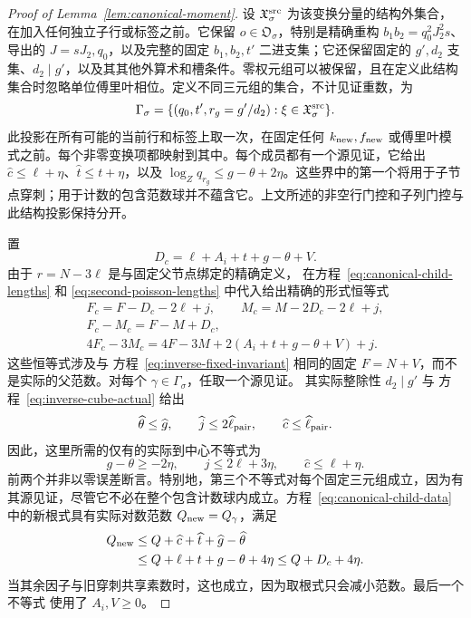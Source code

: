 \documentclass[11pt,a4paper]{article}
\numberwithin{equation}{section}
\numberwithin{figure}{section}
\theoremstyle{definition}
\theoremstyle{remark}
\begin{document}
\begin{proof}[Proof of Lemma~\ref{lem:canonical-moment}]
设 \(\mathfrak X_\sigma^{\rm src}\) 为该变换分量的结构外集合，在加入任何独立子行或标签之前。它保留
\(o\in\mathfrak O_\sigma\)，特别是精确重构
\(b_1b_2=q_0^2J_2^2s\)、导出的 \(J=sJ_2,q_0\)，以及完整的固定
\(b_1,b_2,t'\) 二进支集；它还保留固定的
\(g',d_2\) 支集、\(d_2\mid g'\)，以及其其他外算术和槽条件。零权元组可以被保留，且在定义此结构集合时忽略单位傅里叶相位。定义不同三元组的集合，不计见证重数，为
\begin{equation}\label{eq:inverse-source-triples}
 \Gamma_\sigma=
 \{(q_0,t',r_g=g'/d_2):\xi\in\mathfrak X_\sigma^{\rm src}\}.
\end{equation}
此投影在所有可能的当前行和标签上取一次，在固定任何 \(k_{\rm new},f_{\rm new}\) 或傅里叶模式之前。每个非零变换项都映射到其中。每个成员都有一个源见证，它给出
\(\widehat c\le\ell+\eta\)、\(\widehat t\le t+\eta\)，以及
\(\log_Zq_{r_g}\le g-\theta+2\eta\)。这些界中的第一个将用于子节点穿刺；用于计数的包含范数球并不蕴含它。上文所述的非空行门控和子列门控与此结构投影保持分开。

置
\[
 D_c=\ell+A_i+t+g-\theta+V.
\]
由于 \(r=N-3\ell\) 是与固定父节点绑定的精确定义，
在方程~\eqref{eq:canonical-child-lengths} 和
\eqref{eq:second-poisson-lengths} 中代入给出精确的形式恒等式
\begin{equation}\label{eq:canonical-transition}
 \begin{gathered}
 F_c=F-D_c-2\ell+j,\qquad M_c=M-2D_c-2\ell+j,\\
 F_c-M_c=F-M+D_c,\\
 4F_c-3M_c=4F-3M+2(A_i+t+g-\theta+V)+j.
 \end{gathered}
\end{equation}
这些恒等式涉及与
方程~\eqref{eq:inverse-fixed-invariant} 相同的固定 \(F=N+V\)，而不是实际的父范数。对每个 \(\gamma\in\Gamma_\sigma\)，任取一个源见证。
其实际整除性 \(d_2\mid g'\) 与
方程~\eqref{eq:inverse-cube-actual} 给出
\[
 \widehat\theta\le\widehat g,\qquad
 \widehat j\le2\widehat\ell_{\rm pair},\qquad
 \widehat c\le\widehat\ell_{\rm pair}.
\]
因此，这里所需的仅有的实际到中心不等式为
\begin{equation}\label{eq:inverse-center-inequalities}
 g-\theta\ge-2\eta,\qquad j\le2\ell+3\eta,\qquad
 \widehat c\le\ell+\eta.
\end{equation}
前两个并非以零误差断言。特别地，第三个不等式对每个固定三元组成立，因为有其源见证，尽管它不必在整个包含计数球内成立。方程~\eqref{eq:canonical-child-data} 中的新根式具有实际对数范数 \(Q_{\rm new}=Q_\gamma\)，满足
\begin{equation}\label{eq:inverse-new-puncture}
 \begin{split}
 Q_{\rm new}&\le Q+\widehat c+\widehat t+\widehat g-\widehat\theta\\
 &\le Q+\ell+t+g-\theta+4\eta\le Q+D_c+4\eta.
 \end{split}
\end{equation}
当其余因子与旧穿刺共享素数时，这也成立，因为取根式只会减小范数。最后一个不等式
使用了 \(A_i,V\ge0\)。


\end{proof}
\end{document}
